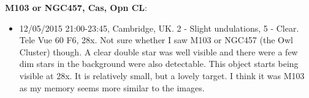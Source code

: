 {\bf M103 or NGC457, Cas, Opn CL}:
\begin{itemize}
\item 12/05/2015 21:00-23:45, Cambridge, UK. 2 - Slight undulations, 5 - Clear. Tele Vue 60 F6, 28x. Not sure whether I saw M103 or NGC457 (the Owl Cluster) though. A clear double star was well visible and there were a few dim stars in the background were also detectable. This object starts being visible at 28x. It is relatively small, but a lovely target. I think it was M103 as my memory seems more similar to the images.
\end{itemize}
